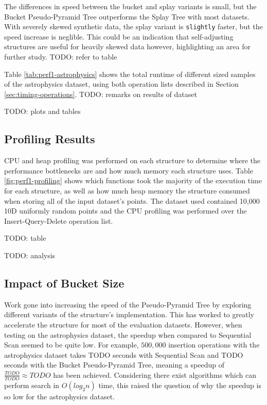 The differences in speed between the bucket and splay variants is small, but the Bucket Pseudo-Pyramid Tree outperforms the Splay Tree with most datasets. With severely skewed synthetic data, the splay variant is \texttt{slightly} faster, but the speed increase is neglible. This could be an indication that self-adjusting structures are useful for heavily skewed data however, highlighting an area for further study. TODO: refer to table

Table \ref{tab:perf1-astrophysics} shows the total runtime of different sized samples of the astrophysics dataset, using both operation lists described in Section \ref{sec:timing-operations}. TODO: remarks on results of dataset

TODO: plots and tables

\subsection{Profiling Results}

CPU and heap profiling was performed on each structure to determine where the performance bottlenecks are and how much memory each structure uses. Table \ref{fig:perf1-profiling} shows which functions took the majority of the execution time for each structure, as well as how much heap memory the structure consumed when storing all of the input dataset's points. The dataset used contained 10,000 10D uniformly random points and the CPU profiling was performed over the Insert-Query-Delete operation list.

TODO: table

TODO: analysis

\subsection{Impact of Bucket Size}

Work gone into increasing the speed of the Pseudo-Pyramid Tree by exploring different variants of the structure's implementation. This has worked to greatly accelerate the structure for most of the evaluation datasets. However, when testing on the astrophysics dataset, the speedup when compared to Sequential Scan seemed to be quite low. For example, $500,000$ insertion operations with the astrophysics dataset takes TODO seconds with Sequential Scan and TODO seconds with the Bucket Pseudo-Pyramid Tree, meaning a speedup of $\frac{TODO}{TODO} \approx TODO$ has been achieved. Considering there exist algorithms which can perform search in $O(log_2 n)$ time, this raised the question of why the speedup is so low for the astrophysics dataset.

